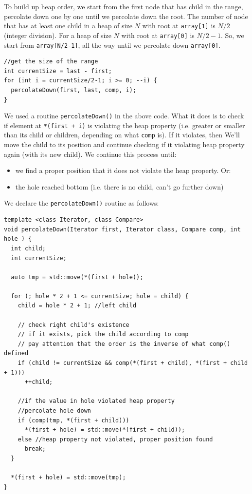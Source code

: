 \documentclass[12pt]{book}
\begin{document}
To build up heap order, we start from the first node that has child in the range, percolate down one by one until we percolate down the root. The number of node that has at least one child in a heap of size \(N\) with root at \texttt{array[1]} is \(N/2\) (integer division). For a heap of size \(N\) with root at \texttt{array[0]} is \(N/2-1\). So, we start from \texttt{array[N/2-1]}, all the way until we percolate down \texttt{array[0]}.

\begin{verbatim}
//get the size of the range 
int currentSize = last - first;
for (int i = currentSize/2-1; i >= 0; --i) {
  percolateDown(first, last, comp, i);
}

\end{verbatim}
We used a routine \texttt{percolateDown()} in the above code. What it does is to check if element at \texttt{*(first + i)} is violating the heap property (i.e. greater or smaller than its child or children, depending on what \texttt{comp} is). If it violates, then We'll move the child to its position and continue checking if it violating heap property again (with its new child). We continue this process until:
\begin{itemize}
\item we find a proper position that it does not violate the heap property. Or:
\item the hole reached bottom (i.e. there is no child, can't go further down)
\end{itemize}

We declare the \texttt{percolateDown()} routine as follows:
\begin{verbatim}
template <class Iterator, class Compare>
void percolateDown(Iterator first, Iterator class, Compare comp, int hole ) {
  int child;
  int currentSize;

  auto tmp = std::move(*(first + hole));

  for (; hole * 2 + 1 <= currentSize; hole = child) {
    child = hole * 2 + 1; //left child

    // check right child's existence
    // if it exists, pick the child according to comp
    // pay attention that the order is the inverse of what comp() defined
    if (child != currentSize && comp(*(first + child), *(first + child + 1)))
      ++child;

    //if the value in hole violated heap property
    //percolate hole down
    if (comp(tmp, *(first + child)))
      *(first + hole) = std::move(*(first + child));
    else //heap property not violated, proper position found
      break;
  }

  *(first + hole) = std::move(tmp);  
}


\end{verbatim}
\end{document}
